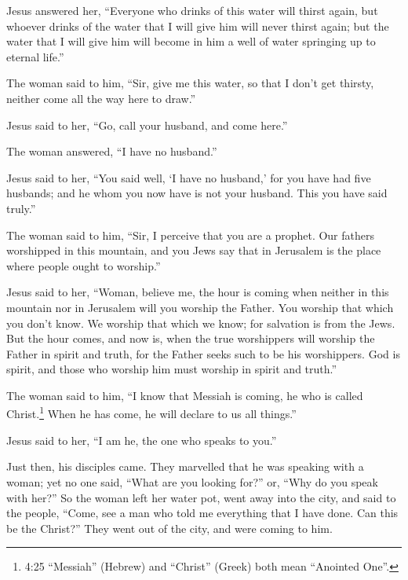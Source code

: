  Jesus answered her, ``Everyone who drinks of this water
will thirst again,  but whoever drinks of the water that I
will give him will never thirst again; but the water that I will give
him will become in him a well of water springing up to eternal life.''

 The woman said to him, ``Sir, give me this water, so that
I don't get thirsty, neither come all the way here to draw.''

 Jesus said to her, ``Go, call your husband, and come
here.''

 The woman answered, ``I have no husband.''

Jesus said to her, ``You said well, `I have no husband,' 
for you have had five husbands; and he whom you now have is not your
husband. This you have said truly.''

 The woman said to him, ``Sir, I perceive that you are a
prophet.  Our fathers worshipped in this mountain, and you
Jews say that in Jerusalem is the place where people ought to worship.''

 Jesus said to her, ``Woman, believe me, the hour is coming
when neither in this mountain nor in Jerusalem will you worship the
Father.  You worship that which you don't know. We worship
that which we know; for salvation is from the Jews.  But
the hour comes, and now is, when the true worshippers will worship the
Father in spirit and truth, for the Father seeks such to be his
worshippers.  God is spirit, and those who worship him must
worship in spirit and truth.''

 The woman said to him, ``I know that Messiah is coming, he
who is called Christ.\footnote{4:25 ``Messiah'' (Hebrew) and ``Christ''
  (Greek) both mean ``Anointed One''.} When he has come, he will declare
to us all things.''

 Jesus said to her, ``I am he, the one who speaks to you.''

 Just then, his disciples came. They marvelled that he was
speaking with a woman; yet no one said, ``What are you looking for?''
or, ``Why do you speak with her?''  So the woman left her
water pot, went away into the city, and said to the people,
 ``Come, see a man who told me everything that I have done.
Can this be the Christ?''  They went out of the city, and
were coming to him.

